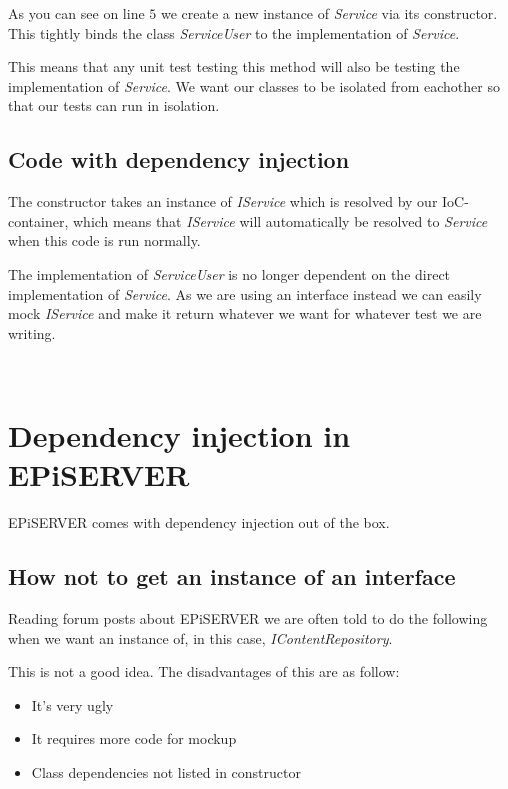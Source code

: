 \documentclass[12pt]{article}
\begin{document}
As you can see on line $5$ we create a new instance of \emph{Service} via its constructor. This tightly binds the class \emph{ServiceUser} to the implementation of \emph{Service}.

This means that any unit test testing this method will also be testing the implementation of \emph{Service}. We want our classes to be isolated from eachother so that our tests can run in isolation.
~\\
\subsection{Code with dependency injection}


The constructor takes an instance of \emph{IService} which is resolved by our IoC-container, which means that \emph{IService} will automatically be resolved to \emph{Service} when this code is run normally.

The implementation of \emph{ServiceUser} is no longer dependent on the direct implementation of \emph{Service}. As we are using an interface instead we can easily mock \emph{IService} and make it return whatever we want for whatever test we are writing.

~\\
\section{Dependency injection in EPiSERVER}
EPiSERVER comes with dependency injection out of the box.

\subsection{How not to get an instance of an interface}
Reading forum posts about EPiSERVER we are often told to do the following when we want an instance of, in this case, \emph{IContentRepository}.



This is not a good idea. The disadvantages of this are as follow:
\begin{itemize}
	\item It's very ugly
	\item It requires more code for mockup
	\item Class dependencies not listed in constructor
\end{itemize}
\end{document}
